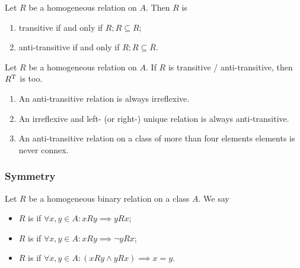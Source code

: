 \begin{lemma}
Let $R$ be a homogeneous relation on $A$. Then $R$ is
\begin{enumerate}
\item transitive \textup{if and only if} $R; R \subseteq R$;
\item anti-transitive \textup{if and only if} $R; R \subseteq \overline{R}$.
\end{enumerate}
\end{lemma}

\begin{lemma}
Let $R$ be a homogeneous relation on $A$. If $R$ is transitive / anti-transitive, then $R^{\mathrm{T}}$ is too.
\end{lemma}


\begin{lemma}
\begin{enumerate}
\item An anti-transitive relation is always irreflexive.
\item An irreflexive and left- (or right-) unique relation is always anti-transitive.
\item An anti-transitive relation on a class of more than four elements elements is never connex.
\end{enumerate}
\end{lemma}

\subsubsection{Symmetry}
\begin{definition}
Let $R$ be a homogeneous binary relation on a class $A$. We say
\begin{itemize}
\item $R$ is  if $\forall x,y\in A: xRy \implies yRx$;
\item $R$ is  if $\forall x,y\in A: xRy \implies \neg yRx$;
\item $R$ is  if $\forall x,y\in A: (xRy\land yRx) \implies x=y$.
\end{itemize}
\end{definition}

